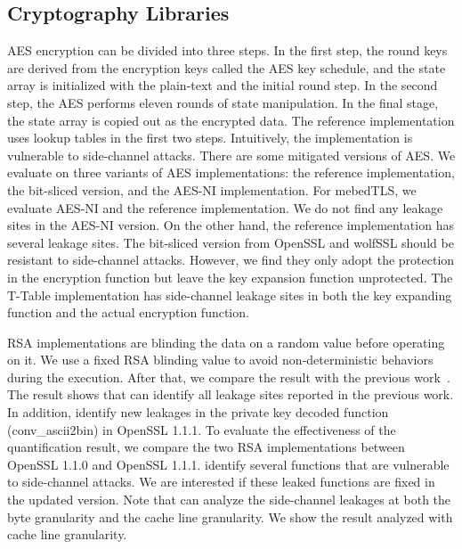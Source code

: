 \subsection{Cryptography Libraries}
AES encryption can be divided into three steps. In the first step, the round keys are derived from the encryption keys called the AES key schedule, and the state array is initialized with the plain-text and the initial round step. In the second step, the AES performs eleven rounds of state manipulation. In the final stage, the state array is copied out as the encrypted data.
The reference implementation uses lookup tables in the first two steps. Intuitively, the implementation is vulnerable to side-channel attacks. There are some mitigated versions of AES. We evaluate \ctool{} on three variants of AES implementations: the reference implementation, the bit-sliced version, and the AES-NI implementation.
For mebedTLS, we evaluate AES-NI and the reference implementation. We do not find any leakage sites in the AES-NI version. On the other hand, the reference implementation has several leakage sites. The bit-sliced version from OpenSSL and wolfSSL should be resistant to side-channel attacks. However, we find they only adopt the protection in the encryption function but leave the key expansion function unprotected. The T-Table implementation has side-channel leakage sites in both the key expanding function and the actual encryption function. 

RSA implementations are blinding the data on a random value before operating on it. We use a fixed RSA blinding value to avoid non-deterministic behaviors during the execution. After that, we compare the result with the previous work~\cite{bao2021abacus,203878}. The result shows that \ctool{} can identify all leakage sites reported in the previous work. In addition, \ctool{} identify new leakages in the private key decoded function (\textsf{conv\_ascii2bin}) in OpenSSL 1.1.1.  To evaluate the effectiveness of the quantification result, we compare the two RSA implementations between OpenSSL 1.1.0 and OpenSSL 1.1.1.  \ctool{} identify several functions that are vulnerable to side-channel attacks. We are interested if these leaked functions are fixed in the updated version.
Note that \ctool{} can analyze the side-channel leakages at both the byte granularity and the cache line granularity. We show the result analyzed with cache line granularity. 

